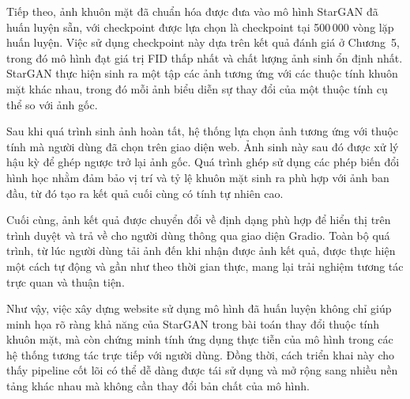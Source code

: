 \documentclass[../DoAn.tex]{subfiles}
\begin{document}
Tiếp theo, ảnh khuôn mặt đã chuẩn hóa được đưa vào mô hình StarGAN đã huấn luyện sẵn, với checkpoint được lựa chọn là checkpoint tại 500\,000 vòng lặp huấn luyện. Việc sử dụng checkpoint này dựa trên kết quả đánh giá ở Chương~5, trong đó mô hình đạt giá trị FID thấp nhất và chất lượng ảnh sinh ổn định nhất. StarGAN thực hiện sinh ra một tập các ảnh tương ứng với các thuộc tính khuôn mặt khác nhau, trong đó mỗi ảnh biểu diễn sự thay đổi của một thuộc tính cụ thể so với ảnh gốc.

Sau khi quá trình sinh ảnh hoàn tất, hệ thống lựa chọn ảnh tương ứng với thuộc tính mà người dùng đã chọn trên giao diện web. Ảnh sinh này sau đó được xử lý hậu kỳ để ghép ngược trở lại ảnh gốc. Quá trình ghép sử dụng các phép biến đổi hình học nhằm đảm bảo vị trí và tỷ lệ khuôn mặt sinh ra phù hợp với ảnh ban đầu, từ đó tạo ra kết quả cuối cùng có tính tự nhiên cao.

Cuối cùng, ảnh kết quả được chuyển đổi về định dạng phù hợp để hiển thị trên trình duyệt và trả về cho người dùng thông qua giao diện Gradio. Toàn bộ quá trình, từ lúc người dùng tải ảnh đến khi nhận được ảnh kết quả, được thực hiện một cách tự động và gần như theo thời gian thực, mang lại trải nghiệm tương tác trực quan và thuận tiện.

Như vậy, việc xây dựng website sử dụng mô hình đã huấn luyện không chỉ giúp minh họa rõ ràng khả năng của StarGAN trong bài toán thay đổi thuộc tính khuôn mặt, mà còn chứng minh tính ứng dụng thực tiễn của mô hình trong các hệ thống tương tác trực tiếp với người dùng. Đồng thời, cách triển khai này cho thấy pipeline cốt lõi có thể dễ dàng được tái sử dụng và mở rộng sang nhiều nền tảng khác nhau mà không cần thay đổi bản chất của mô hình.
\end{document}
